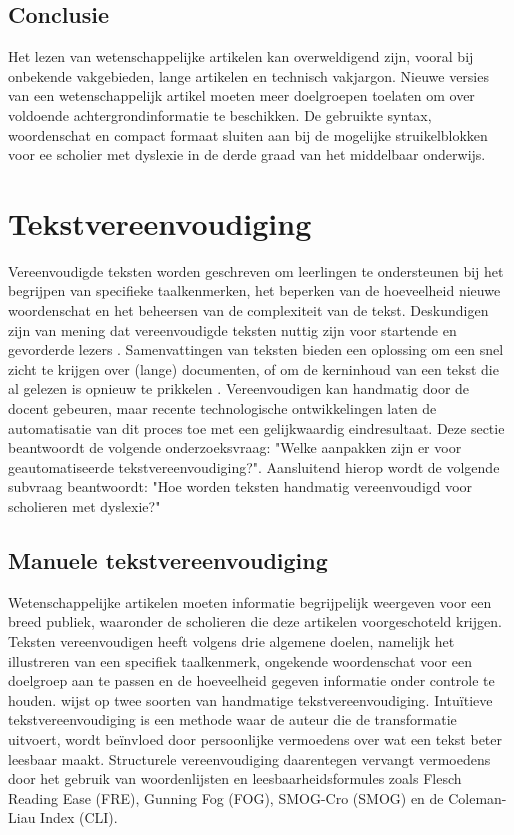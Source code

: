 \subsection{Conclusie}

Het lezen van wetenschappelijke artikelen kan overweldigend zijn, vooral bij onbekende vakgebieden, lange artikelen en technisch vakjargon. Nieuwe versies van een wetenschappelijk artikel moeten meer doelgroepen toelaten om over voldoende achtergrondinformatie te beschikken. De gebruikte syntax, woordenschat en compact formaat sluiten aan bij de mogelijke struikelblokken voor ee scholier met dyslexie in de derde graad van het middelbaar onderwijs. 

\section{Tekstvereenvoudiging}

Vereenvoudigde teksten worden geschreven om leerlingen te ondersteunen bij het begrijpen van specifieke taalkenmerken, het beperken van de hoeveelheid nieuwe woordenschat en het beheersen van de complexiteit van de tekst. Deskundigen zijn van mening dat vereenvoudigde teksten nuttig zijn voor startende en gevorderde lezers \autocite{Louwerse2007}. Samenvattingen van teksten bieden een oplossing om een snel zicht te krijgen over (lange) documenten, of om de kerninhoud van een tekst die al gelezen is opnieuw te prikkelen \autocite{McCombes2022}. Vereenvoudigen kan handmatig door de docent gebeuren, maar recente technologische ontwikkelingen laten de automatisatie van dit proces toe met een gelijkwaardig eindresultaat. Deze sectie beantwoordt de volgende onderzoeksvraag: "Welke aanpakken zijn er voor geautomatiseerde tekstvereenvoudiging?". Aansluitend hierop wordt de volgende subvraag beantwoordt: "Hoe worden teksten handmatig vereenvoudigd voor scholieren met dyslexie?"

\subsection{Manuele tekstvereenvoudiging}

Wetenschappelijke artikelen moeten informatie begrijpelijk weergeven voor een breed publiek, waaronder de scholieren die deze artikelen voorgeschoteld krijgen. Teksten vereenvoudigen heeft volgens \textcite{Crossley2012} drie algemene doelen, namelijk het illustreren van een specifiek taalkenmerk, ongekende woordenschat voor een doelgroep aan te passen en de hoeveelheid gegeven informatie onder controle te houden. \textcite{Crossley2012} wijst op twee soorten van handmatige tekstvereenvoudiging. Intuïtieve tekstvereenvoudiging is een methode waar de auteur die de transformatie uitvoert, wordt beïnvloed door persoonlijke vermoedens over wat een tekst beter leesbaar maakt. Structurele vereenvoudiging daarentegen vervangt vermoedens door het gebruik van woordenlijsten en leesbaarheidsformules zoals Flesch Reading Ease (FRE), Gunning Fog (FOG), SMOG-Cro (SMOG) en de Coleman-Liau Index (CLI).

